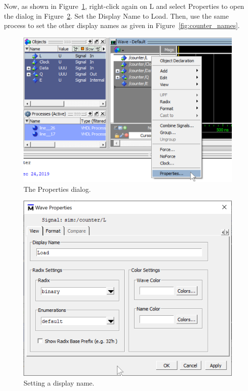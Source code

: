 \documentclass[11pt, twoside, pdftex]{article}
\begin{document}
Now, as shown in Figure~\ref{fig:counter_prop}, right-click again on {\sf L} and select 
{\sf Properties} to open the dialog in Figure~\ref{fig:counter_name}. Set the {\sf Display Name}
to {\sf Load}. Then, use the same process to set the other display names as given in 
Figure~\ref{fig:counter_names}.

\begin{figure}[H]
   \begin{center}
      \includegraphics[scale=.75]{figures/counter_prop.png}
   \caption{The Properties dialog.} 
	 \label{fig:counter_prop}
	 \end{center}
\end{figure}

\begin{figure}[H]
   \begin{center}
      \includegraphics[scale=.75]{figures/counter_name.png}
   \caption{Setting a display name.} 
	 \label{fig:counter_name}
	 \end{center}
\end{figure}
\end{document}
